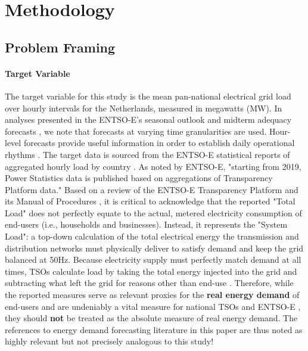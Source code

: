 
\section{Methodology}
\label{sec:methodology}

\subsection{Problem Framing}
\label{subsec:problem_framing}

\paragraph{Target Variable}
The target variable for this study is the mean pan-national electrical grid load over hourly intervals for the Netherlands, measured in megawatts (MW). In analyses presented in the ENTSO-E's seasonal outlook \cite{nseasonal} and midterm adequacy forecasts \cite{midterm_adequacy}, we note that forecasts at varying time granularities are used. Hour-level forecasts provide useful information in order to establish daily operational rhythms \cite{midterm_adequacy, nseasonal}. The target data is sourced from the ENTSO-E statistical reports of aggregated hourly load by country \cite{entsoe_power_stats}. As noted by ENTSO-E, "starting from 2019, Power Statistics data is published based on aggregations of Transparency Platform data." Based on a review of the ENTSO-E Transparency Platform and its Manual of Procedures \cite{entsoe_mop}, it is critical to acknowledge that the reported "Total Load" does not perfectly equate to the actual, metered electricity consumption of end-users (i.e., households and businesses). Instead, it represents the "System Load": a top-down calculation of the total electrical energy the transmission and distribution networks must physically deliver to satisfy demand and keep the grid balanced at 50Hz. Because electricity supply must perfectly match demand at all times, TSOs calculate load by taking the total energy injected into the grid and subtracting what left the grid for reasons other than end-use \cite{entsoe_mop}. Therefore, while the reported measures serve as relevant proxies for the \textbf{real energy demand}  of end-users and are undeniably a vital measure for national TSOs and ENTSO-E \cite{entsoe_mop}, they should \textbf{not} be treated as the absolute measure of real energy demand. The references to energy demand forecasting literature in this paper are thus noted as highly relevant but not precisely analogous to this study!

